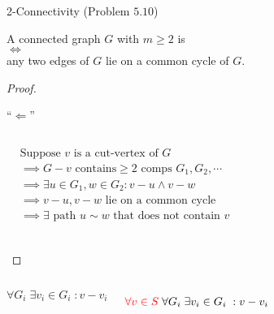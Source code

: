 \begin{frame}{}
  \begin{exampleblock}{2-Connectivity (Problem $5.10$)}
    \begin{center}
      A connected graph $G$ with $m \ge 2$ is  \\[3pt]
      $\iff$ \\[3pt]
      any two  edges of $G$ lie on a common cycle of $G$.
    \end{center}
  \end{exampleblock}

  \begin{proof}
    \begin{center}
      ``$\Longleftarrow$'' \\[6pt]
    \end{center}

    \pause
    \vspace{-0.30cm}
    \begin{columns}
	\begin{align*}
	  &\text{Suppose } v \text{ is a cut-vertex of } G \\
	  &\implies G - v \text{ contains} \ge 2 \text{ comps } G_1, G_2, \cdots \\
	  &\implies \exists u \in G_1, w \in G_2: v-u \land v-w \\
	  &\implies v-u, v-w \text{ lie on a common cycle} \\
	  &\implies \exists \text{ path } u \sim w \text{ that does not contain } v \\
	\end{align*}
    \end{columns}
  \end{proof}
\end{frame}

\begin{frame}{}
  \begin{columns}

      \[
	\forall G_i\; \exists v_i \in G_i\;: v - v_i
      \]
      \pause

      \pause
      \vspace{-0.50cm}
      \[
	\textcolor{red}{\forall v \in S}\; \forall G_i\; \exists v_i \in G_i\;: v - v_i
      \]
  \end{columns}
\end{frame}

